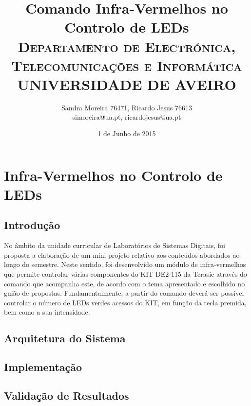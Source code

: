 \documentclass[a4paper,11pt,openright,oneside]{report}
\begin{document}
\title{\textbf{Comando Infra-Vermelhos no Controlo de LEDs}\\[1cm]\textsc{\small {Departamento de Electrónica, Telecomunicações e Informática} \\ \large {UNIVERSIDADE DE AVEIRO}}}
\author{Sandra Moreira 76471, Ricardo Jesus 76613\\simoreira@ua.pt, ricardojesus@ua.pt}
\date{1 de Junho de 2015}
\maketitle
{}

\chapter{Infra-Vermelhos no Controlo de LEDs}

\section{Introdução}
\label{sec:introdução}

No âmbito da unidade curricular de Laboratórios de Sistemas Digitais, foi proposta a elaboração de um mini-projeto relativo aos conteúdos abordados ao longo do semestre. Neste sentido, foi desenvolvido um módulo de infra-vermelhos que permite controlar várias componentes do KIT DE2-115 da Terasic através do comando que acompanha este, de acordo com o tema apresentado e escolhido no guião de propostas. Fundamentalmente, a partir do comando deverá ser possível controlar o número de LEDs verdes acessos do KIT, em função da tecla premida, bem como a sua intensidade.

\section{Arquitetura do Sistema}
\label{sec:arquitetura}



\section{Implementação}
\label{sec:implementação}



\section{Validação de Resultados}
\label{sec:validação}
\end{document}
